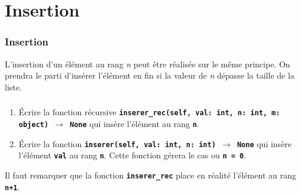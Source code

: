 \documentclass[svgnames,11pt]{beamer}
\begin{document}
\section{Insertion}
\begin{frame}
    \frametitle{Insertion}

L'insertion d'un élément au rang \emph{n} peut être réalisée sur le même principe. On prendra le parti d'insérer l'élément en fin si la valeur de \emph{n} dépasse la taille de la liste.


    \begin{center}
    \end{center}
    \begin{center}
    \end{center}
\end{frame}
\begin{frame}
    \frametitle{}

\begin{activite}
\begin{enumerate}
    \item Écrire la fonction récursive \textbf{\texttt{inserer\_rec(self, val: int, n: int, m: object) $\rightarrow$ None}} qui insère l'élément au rang \textbf{\texttt{n}}.
    \item Écrire la fonction \textbf{\texttt{inserer(self, val: int, n: int) $\rightarrow$ None}} qui insère l'élément \textbf{\texttt{val}} au rang \textbf{\texttt{n}}. Cette fonction gérera le cas ou \textbf{\texttt{n = 0}}.
\end{enumerate}
\end{activite}
\begin{aretenir}[Remarque]
Il faut remarquer que la fonction \textbf{\texttt{inserer\_rec}} place en réalité l'élément au rang \textbf{\texttt{n+1}}.
\end{aretenir}
\end{frame}
\end{document}
